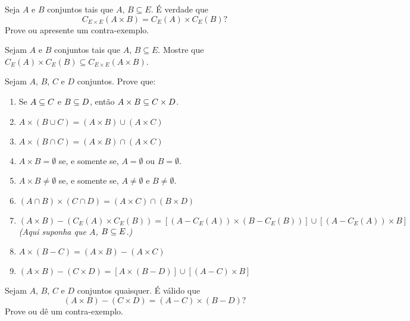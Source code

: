 \documentclass[12pt]{exam}
\begin{document}
    \questao{} Seja $A$ e $B$ conjuntos tais que $A$, $B \subseteq E$. É verdade que
    \[
        C_{E\times E}(A \times B) = C_E(A) \times C_E(B)?
    \]
    Prove ou apresente um contra-exemplo.

    \vspace{.3cm}

    \questao{} Sejam $A$ e $B$ conjuntos tais que $A$, $B \subseteq E$. Mostre que $C_E(A) \times C_E(B) \subseteq C_{E \times E}(A \times B)$.

    \vspace{.3cm}

    \questao{} Sejam $A$, $B$, $C$ e $D$ conjuntos. Prove que:
    \begin{enumerate}[label={\alph*})]
        \item Se $A \subseteq C$ e $B \subseteq D$, ent\~ao $A \times B \subseteq C \times D$.

        \item $A \times (B \cup C) = (A \times B) \cup (A \times C)$

        \item $A \times (B \cap C) = (A \times B) \cap (A \times C)$

        \item $A \times B = \emptyset$ se, e somente se, $A = \emptyset$ ou $B = \emptyset$.

        \item $A \times B \ne \emptyset$ se, e somente se, $A \ne \emptyset$ e $B \ne \emptyset$.

        \item $(A \cap B) \times (C \cap D) = (A \times C) \cap (B \times D)$

        \item $(A \times B) - (C_E(A) \times C_E(B)) = [(A - C_E(A)) \times (B - C_E(B))] \cup [(A - C_E(A)) \times B]$  \textit{(Aqui suponha que $A$, $B \subseteq E$.)}

        \item $A \times (B - C) = (A \times B) - (A \times C)$

        \item $(A \times B) - (C \times D) = [A \times (B - D)] \cup [(A - C) \times B]$
    \end{enumerate}

    \vspace{.3cm}

    \questao{} Sejam $A$, $B$, $C$ e $D$ conjuntos quaisquer. É válido que
    \[
        (A \times B) - (C \times D) = (A - C) \times (B - D)?
    \]
    Prove ou dê um contra-exemplo.
\end{document}
